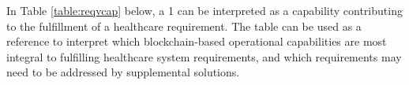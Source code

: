 \documentclass[12pt]{report}
\begin{document}
In Table \ref{table:reqvcap} below, a 1 can be interpreted as a capability contributing to the fulfillment of a healthcare requirement. The table can be used as a reference to interpret which blockchain-based operational capabilities are most integral to fulfilling healthcare system requirements, and which requirements may need to be addressed by supplemental solutions.
\begin{comment}
\begin{center}
\captionof{table}{Requirements vs Capabilities}
\begin{tabularx}{\columnwidth}{XXXXXX}
 \hline
  \textbf{Requirements/Capabilties} & \textbf{Auditability} & \textbf{Transfer of Value} & \textbf{Security} & \textbf{Decentralization of Trust} & } & \textbf{Total} \\ 
 \hline
 \textbf{Cost Reduction} & 1 & 1 & 1 & 1 & 4\\
 \hline
 \textbf{Fraud Prevention} & 1 & 0 & 1 & 1 & 3\\
 \hline
 \textbf{Identity Management} & 0 & 0 & 1 & 1 & 2\\
 \hline
 \textbf{Record Availability} & 1 & 1 & 0 & 0 & 2\\
 \hline
 \textbf{HIPAA Compliance} & 1 & 0 & 1 & 0 & 2\\
 \hline
 \textbf{Universality of Record} & 1 & 0 & 0 & 1 & 2\\
 \hline
 \textbf{Auditability} & 1 & 1 & 0 & 0 & 2\\
 \hline
 \textbf{Reconciliation} & 1 & 0 & 0 & 0 & 1\\
 \hline
 \textbf{Interoperability} & 1 & 0 & 0 & 0 & 1\\
 \hline
 \textbf{Encourage Patient Engagement} & 0 & 1 & 0 & 0 & 1\\
 \hline
 \textbf{Total} & 9 & 5 & 4 & 4 & .\\
 \hline
\label{table:reqvcap}
\end{tabularx}
\end{center}
\end{comment}
\end{document}
